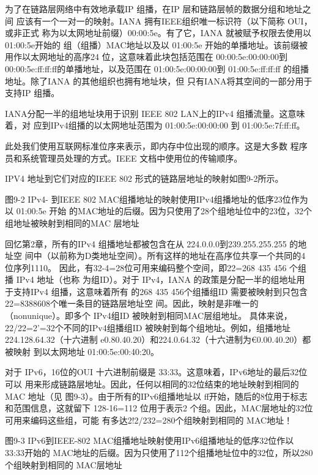 为了在链路层网络中有效地承载IP 组播，在IP 层和链路层帧的数据分组和地址之间
应该有一个一对一的映射。IANA 拥有IEEE组织唯一标识符（以下简称 OUI，或非正式
称为以太网地址前缀）00:00:5e。有了它，IANA 就被赋予权限去使用以01:00:5e开始的
组（组播）MAC地址以及以 01:00:5e 开始的单播地址。该前缀被用作以太网地址的高序24
位，这意味着此块包括范围在 00:00:5e:00:00:00到 00:00:5e:ff:ff:ff的单播地址，以及范围在
01:00:5e:00:00:00到 01:00:5e:ff:ff:ff 的组播地址。除了IANA 的其他组织也拥有地址块，但
只有IANA将其空间的一部分用于支持IP 组播。

IANA分配一半的组地址块用于识别 IEEE 802 LAN上的IPv4 组播流量。这意味着，对
应到IPv4组播的以太网地址范围为 01:00:5e:00:00:00 到 01:00:5e:7f:ff:ff。

\begin{tcolorbox}
    此处我们使用互联网标准位序来表示，即内存中位出现的顺序。这是大多数
    程序员和系统管理员处理的方式。IEEE 文档中使用位的传输顺序。
\end{tcolorbox}

IPV4 地址到它们对应的IEEE 802 形式的链路层地址的映射如图9-2所示。

图9-2 IPv4- 到IEEE 802 MAC组播地址的映射使用IPv4组播地址的低序23位作为以 01:00:5e 开始
的MAC地址的后缀。因为只使用了28个组地址位中的23位，32个组地址被映射到相同的MAC 层地址

回忆第2章，所有的IPv4 组播地址都被包含在从 224.0.0.0到239.255.255.255 的地址空
间中（以前称为D类地址空间）。所有这样的地址在高序位共享一个共同的4位序列1110。
因此，有32-4=28位可用来编码整个空间，即22=268 435 456 个组播 IPv4 地址（也称
为组ID）。对于 IPv4，IANA 的政策是分配一半的组地址用于支持IPv4 组播，这意味着所有
的268 435 456个组播组ID 需要被映射到只包含22=8388608个唯一条目的链路层地址空
间。因此，映射是非唯一的（nonunique）。即多个 IPv4组ID 被映射到相同MAC层组地址。
具体来说，22/22=2’=32个不同的IPv4组播组ID 被映射到每个组地址。例如，组播地址
224.128.64.32（十六进制 e0.80.40.20）和224.0.64.32（十六进制为€0.00.40.20）都被映射
到以太网地址 01:00:5e:00:40:20。

对于 IPv6，16位的OUI 十六进制前缀是 33:33。这意味着，IPv6地址的最后32位可以
用来形成链路层地址。因此，任何以相同的32位结束的地址映射到相同的MAC 地址（见
图9-3）。由于所有的IPv6组播地址以 ff开始，随后的8位用于标志和范围信息，这就留下
128-16=112 位用于表示2 个组。因此，MAC层地址的32位可用来编码这些组，可能
有多达2!2/232=280个组映射到相同的 MAC地址！

图9-3 IPv6到IEEE-802 MAC组播地址映射使用IPv6组播地址的低序32位作以33:33开始的
MAC地址的后缀。因为只使用了112个组播地址位中的32位，所以280个组映射到相同的
MAC层地址

